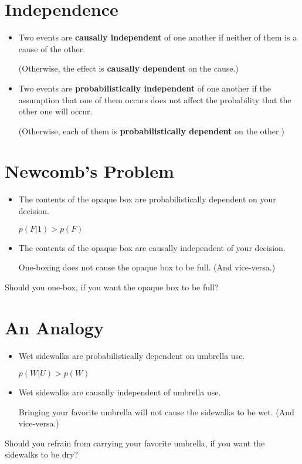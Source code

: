 \documentclass[12pt]{extarticle}
\begin{document}
\section{Independence}


\begin{itemize}
\item Two events are \textbf{causally independent} of one another if neither of them is a cause of the other. 

(Otherwise, the effect is  \textbf{causally dependent}  on the cause.\label{gloss:ca-dep})

\item Two events are \textbf{probabilistically independent} of one another if the assumption
that one of them occurs does not affect the probability that the other
one will occur.

(Otherwise, each of them is \textbf{probabilistically
dependent} on the other.\label{gloss:pr-dep})

\end{itemize}

\section{Newcomb's Problem}

\begin{itemize}

\item The contents of the opaque box are probabilistically dependent on your decision.

$p(F|1) > p(F)$


\item The contents of the opaque box are causally independent of your decision.

One-boxing does not cause the opaque box to be full. (And vice-versa.)

\end{itemize}
Should you one-box, if you want the opaque box to be full?

\section{An Analogy}


\begin{itemize}

\item Wet sidewalks are probabilistically dependent on umbrella use.

$p(W|U) > p(W)$

\item Wet sidewalks are causally independent of umbrella use.

Bringing your favorite umbrella will not cause the sidewalks to be wet. (And vice-versa.)

\end{itemize}
Should you refrain from carrying your favorite umbrella, if you want the sidewalks to be dry?
\end{document}
